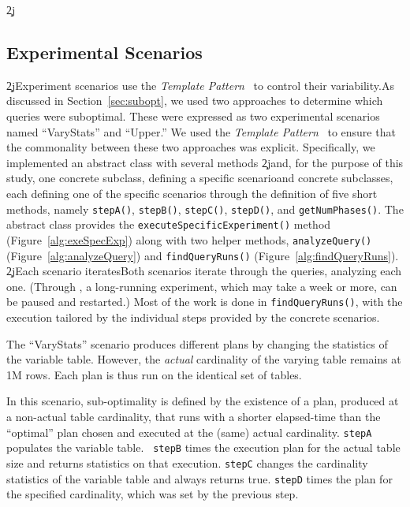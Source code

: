 \c2j{}{\subsection{Experimental Scenarios}}
\c2j{Experiment scenarios use the {\em Template Pattern}~\cite{gamma95} to
  control their variability.}{As discussed in Section~\ref{sec:subopt}, we used two approaches to
determine which queries were suboptimal. These were expressed as two
experimental scenarios named ``VaryStats'' and ``Upper.'' We used the
{\em Template Pattern}~\cite{gamma95} to ensure that the commonality between
these two approaches was explicit.} Specifically, we implemented
an abstract class with several methods \c2j{and, for the purpose of this
  study, one concrete subclass, defining a specific scenario}{and concrete
  subclasses, each defining one of the specific scenarios} through the definition of five
short methods, namely {\tt stepA()}, {\tt stepB()}, {\tt stepC()},
{\tt stepD()}, and {\tt getNumPhases()}. The abstract class provides the
{\tt execute\-SpecificExperiment()}
method (Figure~\ref{alg:exeSpecExp}) along with two helper methods,
{\tt analyze\-Query()} (Figure~\ref{alg:analyzeQuery}) and {\tt findQuery\-Runs()}
(Figure~\ref{alg:findQueryRuns}). \c2j{Each scenario iterates}{Both scenarios iterate} through the
queries, analyzing each one. (Through \azdb, a long-running
experi\-ment, which may take a week or more, can be paused and
restarted.) Most of the work is done in {\tt findQuery\-Runs()}, with the
execution tailored by the individual steps provided by the concrete scenarios.

The ``VaryStats'' scenario produces different plans by changing the
statistics of the variable table.  However, the {\em actual} cardinality of
the varying table remains at 1M rows. Each plan is thus run on the identical
set of tables. 

In this scenario, sub-optimality is defined by the existence
of a plan, produced at a non-actual table cardinality, that runs with a
shorter elapsed-time than the ``optimal'' plan chosen and executed at the
(same) actual cardinality. {\tt stepA} populates the variable table. {\tt
  stepB} times the execution plan for the actual table size and returns
statistics on that execution. {\tt stepC} changes the cardinality statistics
of the variable table and always returns true. {\tt stepD} times the plan
for the specified cardinality, which was set by the previous step.

